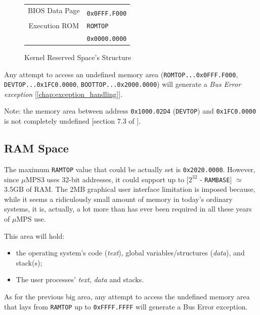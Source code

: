 \documentclass[12pt,a4paper,openright,twoside]{report}
\begin{document}
\begin{figure}[ht]
\begin{tabular}{cl}
		\multicolumn{1}{|c|}{\multirow{2}{*}{BIOS Data Page}}               &                                       \\ [-1ex]
		\multicolumn{1}{|c|}{}                                              & \multirow{2}{*}{\texttt{0x0FFF.F000}} \\ \cline{1-1}
		\multicolumn{1}{|l|}{\multirow{2}{*}{\cellcolor{gray}}}             &                                       \\ [-3ex]
		\multicolumn{1}{|l|}{\cellcolor{gray}}                              & \multirow{2}{*}{\texttt{ROMTOP}}      \\ \cline{1-1}
		\multicolumn{1}{|c|}{\multirow{2}{*}{Execution ROM}}                &                                       \\ [-1ex]
		\multicolumn{1}{|c|}{}                                              & \multirow{2}{*}{\texttt{0x0000.0000}} \\ \cline{1-1}
		\multicolumn{1}{l}{}                                                &
	\end{tabular}
	\caption{Kernel Reserved Space's Structure}
	\label{fig:kernel_reserved_space}
\end{figure}
Any attempt to access an undefined memory area (\texttt{ROMTOP...0x0FFF.F000}, \texttt{DEVTOP...0x1FC0.0000}, \texttt{BOOTTOP...0x2000.0000}) will generate a \textit{Bus Error exception} [\autoref{chap:exception_handling}].

Note: the memory area between address \texttt{0x1000.02D4} (\texttt{DEVTOP}) and \texttt{0x1FC0.0000} is not completely undefined [section 7.3 of \cite{old_pops}].

\subsection{RAM Space}
The maximum \texttt{RAMTOP} value that could be actually set is \texttt{0x2020.0000}.
However, since $\mu$MPS3 uses 32-bit addresses, it could support up to [$2^{32}$ - \texttt{RAMBASE}] $\simeq$ 3.5GB of RAM.
The 2MB graphical user interface limitation is imposed because, while it seems a ridiculously small amount of memory in today's ordinary systems, it is, actually, a lot more than has ever been required in all these years of $\mu$MPS use.

This area will hold:
\begin{itemize}
	\item the operating system's code (\textit{text}), global variables/structures (\textit{data}), and stack(s);
	\item The user processes' \textit{text}, \textit{data} and stacks.
\end{itemize}
As for the previous big area, any attempt to access the undefined memory area that lays from \texttt{RAMTOP} up to \texttt{0xFFFF.FFFF} will generate a Bus Error exception.
\end{document}
